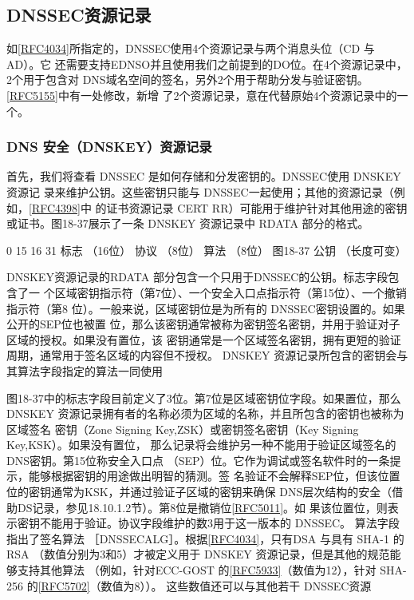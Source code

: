 \subsection{DNSSEC资源记录}
如\href{https://www.rfc-editor.org/rfc/rfc4034}{[RFC4034]}所指定的，DNSSEC使用4个资源记录与两个消息头位（CD 与AD）。它
还需要支持EDNSO并且使用我们之前提到的DO位。在4个资源记录中，2个用于包含对
DNS域名空间的签名，另外2个用于帮助分发与验证密钥。\href{https://www.rfc-editor.org/rfc/rfc5155}{[RFC5155]}中有一处修改，新增
了2个资源记录，意在代替原始4个资源记录中的一个。

\subsubsection{DNS 安全（DNSKEY）资源记录}
首先，我们将查看 DNSSEC 是如何存储和分发密钥的。DNSSEC使用 DNSKEY 资源记
录来维护公钥。这些密钥只能与 DNSSEC一起使用；其他的资源记录（例如，\href{https://www.rfc-editor.org/rfc/rfc4398}{[RFC4398]}中
的证书资源记录 CERT RR）可能用于维护针对其他用途的密钥或证书。图18-37展示了一条
DNSKEY 资源记录中 RDATA 部分的格式。

0
15 16
31
标志
（16位）
协议
（8位）
算法
（8位）
图18-37
公钥
（长度可变）

DNSKEY资源记录的RDATA 部分包含一个只用于DNSSEC的公钥。标志字段包含了一
个区域密钥指示符（第7位）、一个安全入口点指示符（第15位）、一个撤销指示符（第8
位）。一般来说，区域密钥位是为所有的 DNSSEC密钥设置的。如果公开的SEP位也被置
位，那么该密钥通常被称为密钥签名密钥，并用于验证对子区域的授权。如果没有置位，该
密钥通常是一个区域签名密钥，拥有更短的验证周期，通常用于签名区域的内容但不授权。
DNSKEY 资源记录所包含的密钥会与其算法字段指定的算法一同使用

图18-37中的标志字段目前定义了3位。第7位是区域密钥位字段。如果置位，那么
DNSKEY 资源记录拥有者的名称必须为区域的名称，并且所包含的密钥也被称为区域签名
密钥（Zone Signing Key,ZSK）或密钥签名密钥（Key Signing Key,KSK）。如果没有置位，
那么记录将会维护另一种不能用于验证区域签名的DNS密钥。第15位称安全入口点
（SEP）位。它作为调试或签名软件时的一条提示，能够根据密钥的用途做出明智的猜测。签
名验证不会解释SEP位，但该位置位的密钥通常为KSK，并通过验证子区域的密钥来确保
DNS层次结构的安全（借助DS记录，参见18.10.1.2节）。第8位是撤销位\href{https://www.rfc-editor.org/rfc/rfc5011}{[RFC5011]}。如
果该位置位，则表示密钥不能用于验证。协议字段维护的数3用于这一版本的 DNSSEC。
算法字段指出了签名算法 ［DNSSECALG］。根据\href{https://www.rfc-editor.org/rfc/rfc4034}{[RFC4034]}，只有DSA 与具有 SHA-1 的 RSA
（数值分别为3和5）才被定义用于 DNSKEY 资源记录，但是其他的规范能够支持其他算法
（例如，针对ECC-GOST 的\href{https://www.rfc-editor.org/rfc/rfc5933}{[RFC5933]}（数值为12），针对 SHA-256 的\href{https://www.rfc-editor.org/rfc/rfc5702}{[RFC5702]}（数值为8））。
这些数值还可以与其他若干 DNSSEC资源

